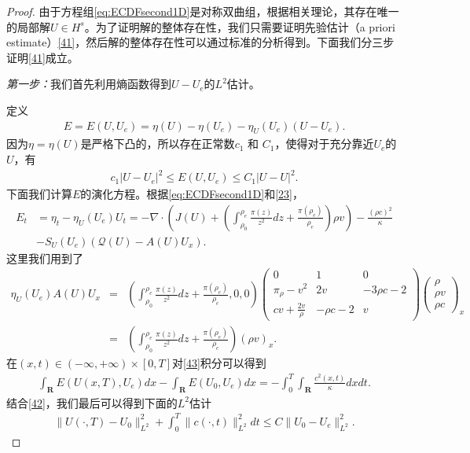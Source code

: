 \begin{proof}
由于方程组\eqref{eq:ECDFsecond1D}是对称双曲组，根据相关理论\cite{majda1984compressible, kato1975cauchy}，其存在唯一的局部解$U \in H^s$。为了证明解的整体存在性，我们只需要证明先验估计（a priori estimate）\eqref{41}，然后解的整体存在性可以通过标准的分析得到\cite{yong2004entropy}。下面我们分三步证明\eqref{41}成立。

\emph{第一步：}我们首先利用熵函数得到$U-U_e$的$L^2$估计。

定义
\begin{eqnarray*}
E=E(U,U_e) = \eta(U)-\eta(U_e)-\eta_U(U_e)(U-U_e).
\end{eqnarray*}
因为$\eta=\eta(U)$是严格下凸的，所以存在正常数$c_1$ 和 $C_1$，使得对于充分靠近$U_e$的$U$，有
\begin{eqnarray}\label{42}
c_1 |U-U_e|^2 \le E(U,U_e) \le C_1 |U-U|^2.
\end{eqnarray}
下面我们计算$E$的演化方程。根据\eqref{eq:ECDFsecond1D}和\eqref{23}，
\begin{eqnarray}\label{43}
E_t &= \eta_t - \eta_U(U_e)U_t = -\nabla \cdot \left(J(U) +( \int_{\rho_0}^{\rho_e} \frac{\pi(z)}{z^2} dz + \frac{\pi(\rho_e)}{\rho_e})\rho v \right) - \frac{(\rho c)^2}{\kappa} \nonumber \\
& - S_U(U_e)(\mathcal{Q}(U) - A(U)U_x).
\end{eqnarray}
这里我们用到了
\begin{eqnarray*}
\eta_U(U_e) A(U) U_x &=& ( \int_{\rho_0}^{\rho_e} \frac{\pi(z)}{z^2} dz + \frac{\pi(\rho_e)}{\rho_e}, 0, 0)
\left( \begin{array}{ccc}
		0 & 1 & 0 \\
		\pi_\rho - v^2 & 2v & -3 \rho c - 2 \\
		cv + \frac{2 v}{\rho} & -  \rho c - 2 & v 
	\end{array}\right)
\left( \begin{array}{ccc}
\rho \\ \rho v \\ \rho c \end{array} \right)_x \\
&=& \left( \int_{\rho_0}^{\rho_e} \frac{\pi(z)}{z^2} dz + \frac{\pi(\rho_e)}{\rho_e}\right) (\rho v )_x.
\end{eqnarray*}
在$(x, t)\in(-\infty, + \infty)\times[0,T]$对\eqref{43}积分可以得到
\begin{eqnarray*}
\int_\mathbf{R}E(U(x, T), U_e)dx - \int_\mathbf{R} E(U_0, U_e)dx = - \int_0^T\int_\mathbf{R} \frac{c^2(x, t)}{\kappa} dx dt.
\end{eqnarray*}
结合\eqref{42}，我们最后可以得到下面的$L^2$估计
\begin{eqnarray}\label{44}
\|U(\cdot, T)-U_0\|^2_{L^2} + \int_0^T \|c(\cdot, t)\|^2_{L^2}dt \le C\|U_0 - U_e\|^2_{L^2}.
\end{eqnarray}


\end{proof}
